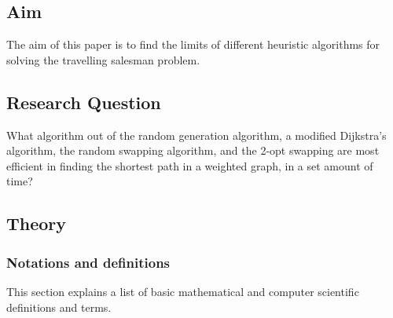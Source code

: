 \documentclass{article}
\begin{document}
\subsection{Aim}\label{Aim}
The aim of this paper is to find the limits of different heuristic algorithms for solving the travelling salesman problem. 

\subsection{Research Question}\label{RQ}
What algorithm out of the random generation algorithm, a modified Dijkstra's algorithm, the random swapping algorithm, and the 2-opt swapping are most efficient in finding the shortest path in a weighted graph, in a set amount of time?



\subsection{Theory}\label{Theory}

\subsubsection{Notations and definitions}\label{Notation and definitions}

This section explains a list of basic mathematical and computer scientific definitions and terms. 
\newline
\end{document}
